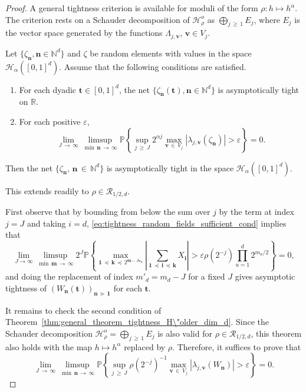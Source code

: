 \documentclass[AHL,Unicode,longabstracts,published]{cedram}
\newcommand{\Rca}{\mathcal{R}}
\newcommand{\clH}{\mathcal{H}}
\newcommand\R{\mathbb{R}}
\newcommand\N{\mathbb{N}}
\newcommand\PP{\mathbb{P}}
\newcommand\ens[1]{\{ #1\}}
\newcommand{\pr}[1]{(#1)}
\newcommand{\gr}[1]{\bm{#1}}
\newcommand{\gri}{\bm{i}}
\newcommand{\grn}{\bm{n}}
\newcommand{\grm}{\bm{m}}
\newcommand{\grk}{\bm{k}}
\newcommand{\imd}{\preccurlyeq}
\newcommand{\smd}{\succcurlyeq }
\begin{document}
\begin{proof}
A general tightness criterion is available for moduli of the form $\rho\colon h\mapsto h^\alpha$. The criterion rests on a Schauder decomposition of $\clH_\rho^o$ as $\bigoplus_{j\,\geq\,1}E_j$, where $E_j$ is the vector space generated by the functions $\Lambda_{j,\gr{v}}$, $\gr{v}\in V_j$.

\begin{theo}[{\cite[Theorem~6]{MR2340883}}]\label{thm:general_theorem_tightness_H\"older_dim_d}
Let $\ens{\zeta_{\grn},\grn\in \N^d}$ and $\zeta$ be random elements with values in the space $\clH_\alpha([0,1]^d)$. Assume that the following conditions are satisfied.
\begin{enumerate}
\item For each dyadic $\gr{t}\in [0,1]^d$, the net $\ens{\zeta_{\grn}(\gr{t}),
\grn\in \N^d}$ is asymptotically tight on $\R$.
\item For each positive $\varepsilon$,
\begin{equation}
\lim_{J\,\to\,\infty}\limsup_{\min\,\grn\,\to\,\infty}
\PP\left\{\sup_{j\,\geqslant\,J}2^{\alpha j}\max_{\gr{v}\,\in\,V_j}\left|\lambda_{j,
\gr{v}}(\zeta_{\grn}) \right|>\varepsilon\right\}=0.
\end{equation}
\end{enumerate}
Then the net $\ens{\zeta_{\grn},\,\grn\,\in\,\N^d}$ is asymptotically tight in the space $\clH_\alpha([0,1]^d)$.
\end{theo}

This extends readily to $\rho\in\Rca_{1/2,d}$.

First observe that by bounding from below the sum over $j$ by the term at index $j=J$ and taking $i=d$, \eqref{eq:tightness_random_fields_sufficient_cond} implies that
\begin{equation}
\lim_{J\to \infty}\limsup_{\min\,\grm\,\to\,\infty} 2^J \PP\left\{\max_{\gr{1}\,\imd\,\gr{k}\,\imd\,2^{\grm -J\gr{e}_d } }
\left|\sum_{\gr{1}\,\imd\,\gri\,\imd\,\grk} X_{\gri} \right|> \varepsilon\rho\left(2^{-j}\right)
\prod_{u=1}^d2^{m_u/2}\right\}=0,
\end{equation}
and doing the replacement of index $m'_d=m_d-J$ for a fixed $J$ gives asymptotic tightness of $ \pr{W_{\grn}\pr{\gr{t}}}_{\grn\,\smd\,\gr{1}}$ for each $\gr{t}$.

It remains to check the second condition of Theorem~\ref{thm:general_theorem_tightness_H\"older_dim_d}. Since the Schauder decomposition $\clH_\rho^o=
\bigoplus_{j\,\geq\,1}E_j$ is also valid for $\rho\in\Rca_{1/2,d}$, this theorem also holds with the map $h\mapsto h^\alpha$ replaced by $\rho$. Therefore, it suffices to prove that
\begin{equation}\label{eq:step_for_tightness}
\lim_{J\,\to\,\infty}\limsup_{\min\,\grn\,\to\,\infty}
\PP\left\{\sup_{j\,\geqslant\,J} \rho\left(2^{-j}\right)^{-1}\max_{\gr{v}\,\in\,V_j}\left|\lambda_{j,
\gr{v}}\left(W_{\grn}\right) \right|>\varepsilon \right\}=0.
\end{equation}



\end{proof}
\end{document}
